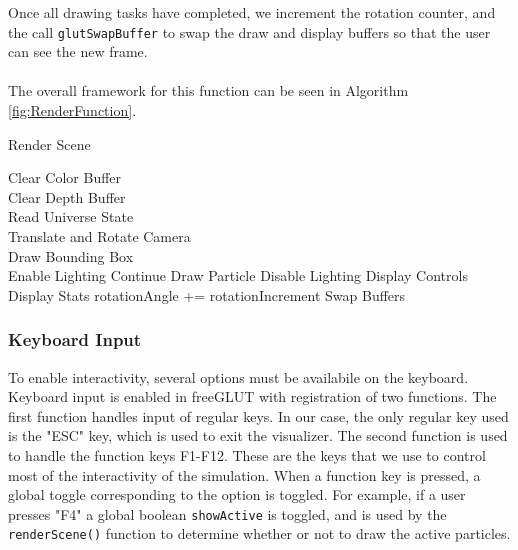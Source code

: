 \documentclass[fleqn,10pt]{UserGuideArx} %
\begin{document}
    Once all drawing tasks have completed, we increment the rotation counter, and the call \texttt{glutSwapBuffer} to swap the draw and display buffers so that the user can see the new frame.\\~\\
    The overall framework for this function can be seen in Algorithm \ref{fig:RenderFunction}.

    \begin{algorithm}
        \caption{Render Scene}\label{fig:RenderFunction}
        Clear Color Buffer\\
        Clear Depth Buffer\\
        Read Universe State\\
        Translate and Rotate Camera\\
        Draw Bounding Box\\
        {
            Enable Lighting
        }
        {
            {
                Continue
            }
            \Else
            {
                Draw Particle
            }
        }
        {
            Disable Lighting
        }
        Display Controls
        Display Stats
        {
            rotationAngle += rotationIncrement 
        }
        Swap Buffers
    \end{algorithm}
    
\subsubsection{Keyboard Input}
    To enable interactivity, several options must be availabile on the keyboard. Keyboard input is enabled in freeGLUT with registration of two functions. The first function handles input of regular keys. In our case, the only regular key used is the "ESC" key, which is used to exit the visualizer. The second function is used to handle the function keys F1-F12. These are the keys that we use to control most of the interactivity of the simulation. When a function key is pressed, a global toggle corresponding to the option is toggled. For example, if a user presses "F4" a global boolean \texttt{showActive} is toggled, and is used by the \texttt{renderScene()} function to determine whether or not to draw the active particles.\\
    
\end{document}
